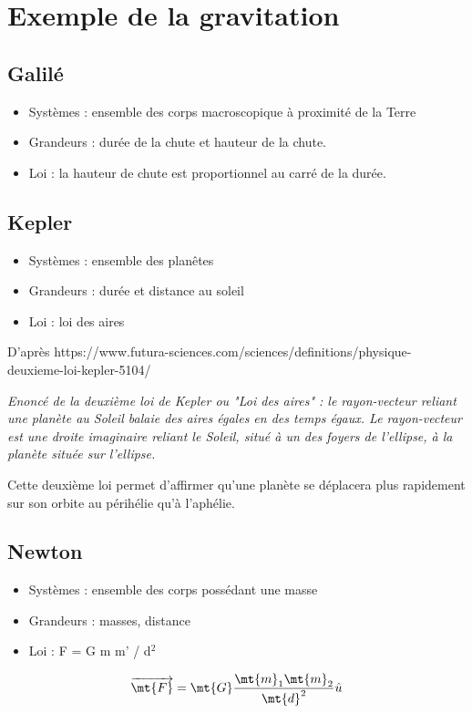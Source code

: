 

\section{Exemple de la gravitation}

  \subsection{Galilé}
\begin{itemize}[leftmargin=1cm, label=, itemsep=1pt]
  \item Systèmes : ensemble des corps macroscopique à proximité de la Terre
  \item Grandeurs : durée de la chute et hauteur de la chute.
  \item Loi : la hauteur de chute est proportionnel au carré de la durée.
\end{itemize}

  \subsection{Kepler}
\begin{itemize}[leftmargin=1cm, label=, itemsep=1pt]
  \item Systèmes : ensemble des planêtes
  \item Grandeurs : durée et distance au soleil
  \item Loi : loi des aires
\end{itemize}
\vspace{0.24cm}
{\footnotesize D'après https://www.futura-sciences.com/sciences/definitions/physique-deuxieme-loi-kepler-5104/}
\vspace{0.31cm}

{\it Enoncé de la deuxième loi de Kepler ou "Loi des aires" : le rayon-vecteur reliant une planète au Soleil balaie des aires égales en des temps égaux. Le rayon-vecteur est une droite imaginaire reliant le Soleil, situé à un des foyers de l'ellipse, à la planète située sur l'ellipse.

Cette deuxième loi permet d'affirmer qu'une planète se déplacera plus rapidement sur son orbite au périhélie qu'à l'aphélie.}


  \subsection{Newton}
\begin{itemize}[leftmargin=1cm, label=, itemsep=1pt]
  \item Systèmes : ensemble des corps possédant une masse
  \item Grandeurs : masses, distance
  \item Loi : F = G m m' / d$^2$
\end{itemize}
\[
\overrightarrow{\mt{F}} = \mt{G}\frac{\mt{m}_1\mt{m}_2}{\mt{d}^2}\hat{u}
\]



